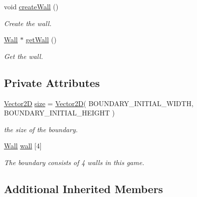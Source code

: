 \begin{DoxyCompactItemize}
\mbox{\label{class_boundary_a5b2345c1e3df23d7ff9246b29fd32dd7}} 
void \mbox{\hyperlink{class_boundary_a5b2345c1e3df23d7ff9246b29fd32dd7}{create\+Wall}} ()
\begin{DoxyCompactList}\small\item\em Create the wall. \end{DoxyCompactList}\item 
\mbox{\label{class_boundary_a2f8e104c9a966f2d5183f951800f97d7}} 
\mbox{\hyperlink{class_wall}{Wall}} $\ast$ \mbox{\hyperlink{class_boundary_a2f8e104c9a966f2d5183f951800f97d7}{get\+Wall}} ()
\begin{DoxyCompactList}\small\item\em Get the wall. \end{DoxyCompactList}\end{DoxyCompactItemize}
\subsection*{Private Attributes}
\begin{DoxyCompactItemize}
\item 
\mbox{\label{class_boundary_aa4c4c5486e042d3e1fccc9e18815aebe}} 
\mbox{\hyperlink{struct_vector2_d}{Vector2D}} \mbox{\hyperlink{class_boundary_aa4c4c5486e042d3e1fccc9e18815aebe}{size}} = \mbox{\hyperlink{struct_vector2_d}{Vector2D}}( B\+O\+U\+N\+D\+A\+R\+Y\+\_\+\+I\+N\+I\+T\+I\+A\+L\+\_\+\+W\+I\+D\+TH, B\+O\+U\+N\+D\+A\+R\+Y\+\_\+\+I\+N\+I\+T\+I\+A\+L\+\_\+\+H\+E\+I\+G\+HT )
\begin{DoxyCompactList}\small\item\em the size of the boundary. \end{DoxyCompactList}\item 
\mbox{\hyperlink{class_wall}{Wall}} \mbox{\hyperlink{class_boundary_a0e79523250fad91c026018059f8aeae5}{wall}} \mbox{[}4\mbox{]}
\begin{DoxyCompactList}\small\item\em The boundary consists of 4 walls in this game. \end{DoxyCompactList}\end{DoxyCompactItemize}
\subsection*{Additional Inherited Members}


